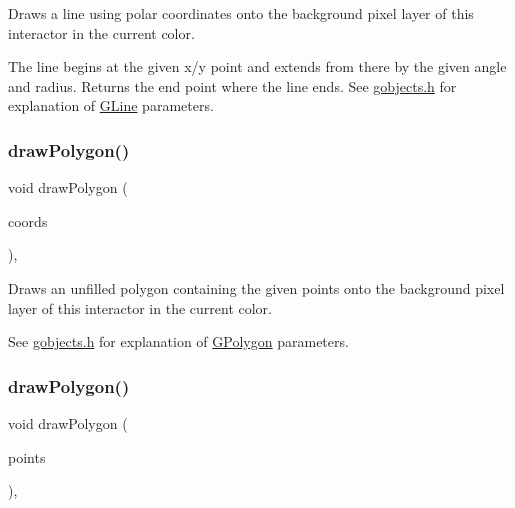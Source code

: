 Draws a line using polar coordinates onto the background pixel layer of this interactor in the current color. 

The line begins at the given x/y point and extends from there by the given angle and radius. Returns the end point where the line ends. See \mbox{\hyperlink{gobjects_8h_source}{gobjects.\+h}} for explanation of \mbox{\hyperlink{classGLine}{G\+Line}} parameters. \mbox{\label{classGDrawingSurface_afddec0a905108d8a8d6809a157f26776}} 
\subsubsection{\texorpdfstring{draw\+Polygon()}{drawPolygon()}\hspace{0.1cm}{\footnotesize\ttfamily [1/2]}}
{\footnotesize\ttfamily void draw\+Polygon (\begin{DoxyParamCaption}\item[{std\+::initializer\+\_\+list$<$ double $>$}]{coords }\end{DoxyParamCaption})\hspace{0.3cm}{\ttfamily [virtual]}, {\ttfamily [inherited]}}



Draws an unfilled polygon containing the given points onto the background pixel layer of this interactor in the current color. 

See \mbox{\hyperlink{gobjects_8h_source}{gobjects.\+h}} for explanation of \mbox{\hyperlink{classGPolygon}{G\+Polygon}} parameters. \mbox{\label{classGDrawingSurface_a021ee881e0d154dc4dd059698742889c}} 
\subsubsection{\texorpdfstring{draw\+Polygon()}{drawPolygon()}\hspace{0.1cm}{\footnotesize\ttfamily [2/2]}}
{\footnotesize\ttfamily void draw\+Polygon (\begin{DoxyParamCaption}\item[{std\+::initializer\+\_\+list$<$ \mbox{\hyperlink{classGPoint}{G\+Point}} $>$}]{points }\end{DoxyParamCaption})\hspace{0.3cm}{\ttfamily [virtual]}, {\ttfamily [inherited]}}




